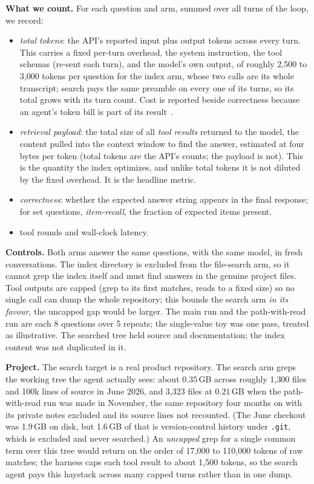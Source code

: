 \documentclass[11pt]{article}
\newcommand{\code}[1]{\texttt{#1}}
\begin{document}
\textbf{What we count.} For each question and arm, summed over all turns of the
loop, we record:
\begin{itemize}
\item \emph{total tokens}: the API's reported input plus output tokens across
every turn. This carries a fixed per-turn overhead, the system instruction, the
tool schemas (re-sent each turn), and the model's own output, of roughly 2{,}500
to 3{,}000 tokens per question for the index arm, whose two calls are its whole
transcript; search pays the same preamble on every one of its turns, so its
total grows with its turn count. Cost is reported beside correctness because an
agent's token bill is part of its result~\cite{kapoor2024}.
\item \emph{retrieval payload}: the total size of all \emph{tool results} returned
to the model, the content pulled into the context window to find the answer,
estimated at four bytes per token (total tokens are the API's counts; the payload
is not). This is the quantity the index optimizes, and
unlike total tokens it is not diluted by the fixed overhead. It is the headline
metric.
\item \emph{correctness}: whether the expected answer string appears in the final
response; for set questions, \emph{item-recall}, the fraction of expected items present.
\item tool rounds and wall-clock latency.
\end{itemize}

\textbf{Controls.} Both arms answer the same questions, with the same model, in
fresh conversations. The index directory is excluded from the file-search arm, so
it cannot grep the index itself and must find answers in the genuine project
files. Tool outputs are capped (grep to its first matches, reads to a fixed size)
so no single call can dump the whole repository; this bounds the search arm
\emph{in its favour}, the uncapped gap would be larger. The main run and the
path-with-read run are each 8 questions over 5 repeats; the single-value toy was
one pass, treated as illustrative. The searched tree held source and
documentation; the index content was not duplicated in it.

\textbf{Project.} The search target is a real product repository. The search arm
greps the working tree the agent actually sees: about $0.35$\,GB across roughly
1{,}300 files and 100k lines of source in June 2026, and 3{,}323 files at
$0.21$\,GB when the path-with-read run was made in November, the same repository
four months on with its private notes excluded and its source lines not
recounted. (The June checkout was 1.9\,GB on disk, but
1.6\,GB of that is version-control history under \code{.git}, which is excluded and
never searched.) An \emph{uncapped} grep for a single common term over this tree
would return on the order of 17{,}000 to 110{,}000 tokens of raw matches; the
harness caps each tool result to about 1{,}500 tokens, so the search agent pays
this haystack across many capped turns rather than in one dump.
\end{document}
